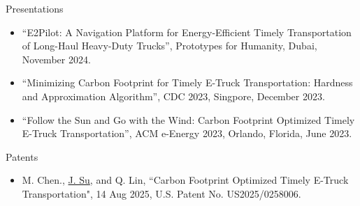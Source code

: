 \documentclass{resume} %
\begin{document}

\begin{rSection}{Presentations}
    \begin{itemize}
        \item ``E2Pilot: A Navigation Platform for Energy-Efficient Timely Transportation of Long-Haul Heavy-Duty Trucks'', Prototypes for Humanity, Dubai, November 2024.
        \item ``Minimizing Carbon Footprint for Timely E-Truck Transportation: Hardness and Approximation Algorithm'', 
        CDC 2023, Singpore, December 2023.
        \item ``Follow the Sun and Go with the Wind: Carbon Footprint Optimized Timely E-Truck Transportation'', ACM e-Energy 2023, Orlando, Florida, June 2023.
    \end{itemize}
\end{rSection}

\begin{rSection}{Patents}
    \begin{itemize}
        \item M. Chen., \underline{J. Su}, and Q. Lin, ``Carbon Footprint Optimized Timely E-Truck Transportation", 14 Aug 2025, U.S. Patent No. US2025/0258006.

    \end{itemize}
\end{rSection}
\end{document}
